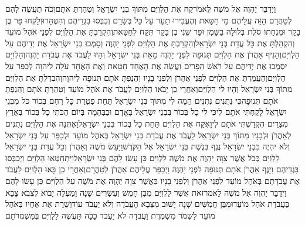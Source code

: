 \documentclass[../main/main.tex]{subfiles}
\begin{document}
\begin{multicols}{\ncols}
וַיְדַבֵּר יַהְוֶה אֶל מֹשֶׁה לֵּאמֹר\PreVerseSpace{}קַח אֶת הַלְוִיִּם מִתּוֹךְ בְּנֵי יִשְׂרָאֵל וְטִהַרְתָּ אֹתָם\PreVerseSpace{}וְכֹה תַעֲשֶׂה לָהֶם לְטַהֲרָם הַזֵּה עֲלֵיהֶם מֵי חַטָּאת וְהֶעֱבִירוּ תַעַר עַל כָּל בְּשָׂרָם וְכִבְּסוּ בִגְדֵיהֶם וְהִטֶּהָרוּ\PreVerseSpace{}וְלָקְחוּ פַּר בֶּן בָּקָר וּמִנְחָתוֹ סֹלֶת בְּלוּלָה בַשָּׁמֶן וּפַר שֵׁנִי בֶן בָּקָר תִּקַּח לְחַטָּאת\PreVerseSpace{}וְהִקְרַבְתָּ אֶת הַלְוִיִּם לִפְנֵי אֹהֶל מוֹעֵד וְהִקְהַלְתָּ אֶת כָּל עֲדַת בְּנֵי יִשְׂרָאֵל\PreVerseSpace{}וְהִקְרַבְתָּ אֶת הַלְוִיִּם לִפְנֵי יַהְוֶה וְסָמְכוּ בְנֵי יִשְׂרָאֵל אֶת יְדֵיהֶם עַל הַלְוִיִּם\PreVerseSpace{}וְהֵנִיף אַהֲרֹן אֶת הַלְוִיִּם תְּנוּפָה לִפְנֵי יַהְוֶה מֵאֵת בְּנֵי יִשְׂרָאֵל וְהָיוּ לַעֲבֹד אֶת עֲבֹדַת יַהְוֶה\PreVerseSpace{}וְהַלְוִיִּם יִסְמְכוּ אֶת יְדֵיהֶם עַל רֹאשׁ הַפָּרִים וַעֲשֵׂה אֶת הָאֶחָד חַטָּאת וְאֶת הָאֶחָד עֹלָה לַיהוָה לְכַפֵּר עַל הַלְוִיִּם\PreVerseSpace{}וְהַעֲמַדְתָּ אֶת הַלְוִיִּם לִפְנֵי אַהֲרֹן וְלִפְנֵי בָנָיו וְהֵנַפְתָּ אֹתָם תְּנוּפָה לַיהוָה\PreVerseSpace{}וְהִבְדַּלְתָּ אֶת הַלְוִיִּם מִתּוֹךְ בְּנֵי יִשְׂרָאֵל וְהָיוּ לִי הַלְוִיִּם\PreVerseSpace{}וְאַחֲרֵי כֵן יָבֹאוּ הַלְוִיִּם לַעֲבֹד אֶת אֹהֶל מוֹעֵד וְטִהַרְתָּ אֹתָם וְהֵנַפְתָּ אֹתָם תְּנוּפָה\PreVerseSpace{}כִּי נְתֻנִים נְתֻנִים הֵמָּה לִי מִתּוֹךְ בְּנֵי יִשְׂרָאֵל תַּחַת פִּטְרַת כָּל רֶחֶם בְּכוֹר כֹּל מִבְּנֵי יִשְׂרָאֵל לָקַחְתִּי אֹתָם לִי\PreVerseSpace{}כִּי לִי כָל בְּכוֹר בִּבְנֵי יִשְׂרָאֵל בָּאָדָם וּבַבְּהֵמָה בְּיוֹם הַכֹּתִי כָל בְּכוֹר בְּאֶרֶץ מִצְרַיִם הִקְדַּשְׁתִּי אֹתָם לִי\PreVerseSpace{}וָאֶקַּח אֶת הַלְוִיִּם תַּחַת כָּל בְּכוֹר בִּבְנֵי יִשְׂרָאֵל\PreVerseSpace{}וָאֶתְּנָה אֶת הַלְוִיִּם נְתֻנִים לְאַהֲרֹן וּלְבָנָיו מִתּוֹךְ בְּנֵי יִשְׂרָאֵל לַעֲבֹד אֶת עֲבֹדַת בְּנֵי יִשְׂרָאֵל בְּאֹהֶל מוֹעֵד וּלְכַפֵּר עַל בְּנֵי יִשְׂרָאֵל וְלֹא יִהְיֶה בִּבְנֵי יִשְׂרָאֵל נֶגֶף בְּגֶשֶׁת בְּנֵי יִשְׂרָאֵל אֶל הַקֹּדֶשׁ\PreVerseSpace{}וַיַּעַשׂ מֹשֶׁה וְאַהֲרֹן וְכָל עֲדַת בְּנֵי יִשְׂרָאֵל לַלְוִיִּם כְּכֹל אֲשֶׁר צִוָּה יַהְוֶה אֶת מֹשֶׁה לַלְוִיִּם כֵּן עָשׂוּ לָהֶם בְּנֵי יִשְׂרָאֵל\PreVerseSpace{}וַיִּתְחַטְּאוּ הַלְוִיִּם וַיְכַבְּסוּ בִּגְדֵיהֶם וַיָּנֶף אַהֲרֹן אֹתָם תְּנוּפָה לִפְנֵי יַהְוֶה וַיְכַפֵּר עֲלֵיהֶם אַהֲרֹן לְטַהֲרָם\PreVerseSpace{}וְאַחֲרֵי כֵן בָּאוּ הַלְוִיִּם לַעֲבֹד אֶת עֲבֹדָתָם בְּאֹהֶל מוֹעֵד לִפְנֵי אַהֲרֹן וְלִפְנֵי בָנָיו כַּאֲשֶׁר צִוָּה יַהְוֶה אֶת מֹשֶׁה עַל הַלְוִיִּם כֵּן עָשׂוּ לָהֶם \ClosedSection{}וַיְדַבֵּר יַהְוֶה אֶל מֹשֶׁה לֵּאמֹר\PreVerseSpace{}זֹאת אֲשֶׁר לַלְוִיִּם מִבֶּן חָמֵשׁ וְעֶשְׂרִים שָׁנָה וָמַעְלָה יָבוֹא לִצְבֹא צָבָא בַּעֲבֹדַת אֹהֶל מוֹעֵד\PreVerseSpace{}וּמִבֶּן חֲמִשִּׁים שָׁנָה יָשׁוּב מִצְּבָא הָעֲבֹדָה וְלֹא יַעֲבֹד עוֹד\PreVerseSpace{}וְשֵׁרֵת אֶת אֶחָיו בְּאֹהֶל מוֹעֵד לִשְׁמֹר מִשְׁמֶרֶת וַעֲבֹדָה לֹא יַעֲבֹד כָּכָה תַּעֲשֶׂה לַלְוִיִּם בְּמִשְׁמְרֹתָם\OpenSection{}\par

\end{multicols}
\end{document}
